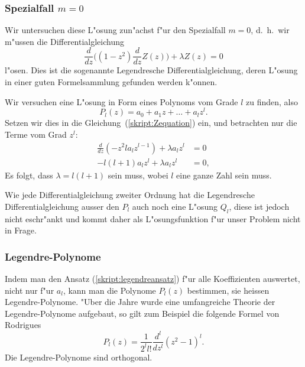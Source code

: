 \subsubsection{Spezialfall $m=0$}
Wir untersuchen diese L"osung zun"achst f"ur den Spezialfall $m=0$,
d.~h.~wir m"ussen die Differentialgleichung
\begin{equation}
\frac{d}{dz}\biggl(
(1-z^2)\frac{d}{dz}Z(z)
\biggr)
+\lambda Z(z)=0
\label{skript:Zequation}
\end{equation}
l"osen.
Dies ist die sogenannte Legendresche Differentialgleichung,
deren L"osung in einer guten Formelsammlung gefunden werden k"onnen.

Wir versuchen eine L"osung in Form eines Polynoms vom
Grade $l$ zu finden, also 
\begin{equation}
P_l(z)=a_0+a_1z+\dots+a_lz^l.
\label{skript:legendreansatz}
\end{equation}
Setzen wir dies in die Gleichung~(\ref{skript:Zequation}) ein, und betrachten nur die
Terme vom Grad $z^l$:
\begin{align*}
\frac{d}{dz}(-z^2la_lz^{l-1})
+
\lambda a_lz^l&=0
\\
-l(l+1)a_lz^l+\lambda a_lz^l&=0,
\end{align*}
Es folgt, dass $\lambda = l(l+1)$ sein muss, wobei $l$ eine ganze
Zahl sein muss.

Wie jede Differentialgleichung zweiter Ordnung hat die Legendresche
Differentialgleichung ausser den $P_l$ auch noch eine L"osung
$Q_l$, diese ist jedoch nicht eschr"ankt und kommt daher als L"osungsfunktion
f"ur unser Problem nicht in Frage.

\subsubsection{Legendre-Polynome}
Indem man den Ansatz (\ref{skript:legendreansatz}) f"ur alle Koeffizienten
auswertet, nicht nur f"ur $a_l$, kann man die Polynome $P_l(z)$ 
bestimmen, sie heissen Legendre-Polynome.
"Uber die Jahre wurde eine umfangreiche Theorie der Legendre-Polynome
aufgebaut, so gilt zum Beispiel die folgende Formel von Rodrigues
\[
P_l(z)=\frac1{2^ll!}\frac{d^l}{dz^l}(z^2 - 1)^l.
\]
Die Legendre-Polynome sind orthogonal.


